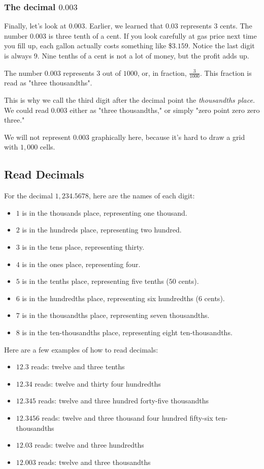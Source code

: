 \subsubsection{The decimal $0.003$}
Finally, let's look at $0.003$. Earlier, we learned that $0.03$ represents $3$ cents. The number $0.003$ is three tenth of a cent. If you look carefully at gas price next time you fill up, each gallon actually costs something like \$$3.159$. Notice the last digit is always $9$. Nine tenths of a cent is not a lot of money, but the profit adds up.

The number $0.003$ represents $3$ out of $1000$, or, in fraction, $\frac{3}{1000}$. This fraction is read as "three thousandths".

This is why we call the third digit after the decimal point the \textit{thousandths place.} We could read $0.003$ either as "three thousandths," or simply "zero point zero zero three."

We will not represent $0.003$ graphically here, because it's hard to draw a grid with $1,000$ cells.

\subsection{Read Decimals}
For the decimal $1,234.5678$, here are the names of each digit:
\begin{itemize}
\item $1$ is in the thousands place, representing one thousand.
\item $2$ is in the hundreds place, representing two hundred.
\item $3$ is in the tens place, representing thirty.
\item $4$ is in the ones place, representing four.
\item $5$ is in the tenths place, representing five tenths ($50$ cents).
\item $6$ is in the hundredths place, representing six hundredths ($6$ cents).
\item $7$ is in the thousandths place, representing seven thousandths.
\item $8$ is in the ten-thousandths place, representing eight ten-thousandths.
\end{itemize}

Here are a few examples of how to read decimals:

\begin{itemize}
\item $12.3$ reads: twelve and three tenths
\item $12.34$ reads: twelve and thirty four hundredths
\item $12.345$ reads: twelve and three hundred forty-five thousandths
\item $12.3456$ reads: twelve and three thousand four hundred fifty-six ten-thousandths
\item $12.03$ reads: twelve and three hundredths
\item $12.003$ reads: twelve and three thousandths
\end{itemize}

